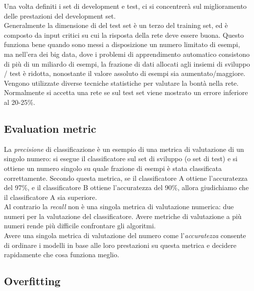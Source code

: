 Una volta definiti i set di development e test, ci si concentrerà sul miglioramento delle prestazioni del development set. \\
Generalmente la dimensione di del test set è un terzo del training set, ed è composto da input critici su cui la risposta della rete deve essere buona.
Questo funziona bene quando sono messi a disposizione un numero limitato di esempi, ma nell'era dei big data, dove i problemi di apprendimento automatico consistono di più di un miliardo di esempi, la frazione di dati allocati agli insiemi di sviluppo / test è ridotta, nonostante il valore assoluto di esempi sia aumentato/maggiore.\\
Vengono utilizzate diverse tecniche statistiche per valutare la bontà nella rete. Normalmente si accetta una rete se sul test set viene mostrato un errore inferiore al 20-25\%.



\subsection{Evaluation metric}
\label{subsec:EvaluationMetric}
La \emph{precisione} di classificazione è un esempio di una metrica di valutazione di un singolo numero: si esegue il classificatore sul set di sviluppo (o set di test) e si ottiene un numero singolo su quale frazione di esempi è stata classificata correttamente. Secondo questa metrica, se il classificatore A ottiene l'accuratezza del 97\%, e il classificatore B ottiene l'accuratezza del 90\%, allora giudichiamo che il classificatore A sia superiore.\\ 
Al contrario la \emph{recall} non è una singola metrica di valutazione numerica: due numeri per la valutazione del classificatore. Avere metriche di valutazione a più numeri rende più difficile confrontare gli algoritmi.
\\
Avere una singola metrica di valutazione del numero come l'\emph{accuratezza} consente di ordinare i modelli in base alle loro prestazioni su questa metrica e decidere rapidamente che cosa funziona meglio.

\subsection{Overfitting}
\label{subsec:overfitting}

